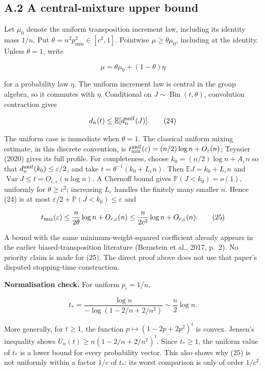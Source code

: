 \documentclass[
  british,
  11pt,
]{article}
\begin{document}
\subsection{A.2 A central-mixture upper
bound}\label{a.2-a-central-mixture-upper-bound}

Let \(\mu_0\) denote the uniform transposition increment law, including
its identity mass \(1/n\). Put \(\theta=n^2p_{\min}^2\in[c^2,1]\).
Pointwise \(\mu\ge\theta\mu_0\), including at the identity. Unless
\(\theta=1\), write

\[\mu=\theta\mu_0+(1-\theta)\eta\]

for a probability law \(\eta\). The uniform increment law is central in
the group algebra, so it commutes with \(\eta\). Conditional on
\(J\sim\operatorname{Bin}(t,\theta)\), convolution contraction gives

\[d_n(t)\le\mathbb E[d_n^{\rm unif}(J)]. \tag{24}\]

The uniform case is immediate when \(\theta=1\). The classical uniform
mixing estimate, in this discrete convention, is
\(t_{\rm mix}^{\rm unif}(\varepsilon)=(n/2)\log n+O_\varepsilon(n)\);
Teyssier (2020) gives its full profile. For completeness, choose
\(k_0=(n/2)\log n+A_\varepsilon n\) so that
\(d_n^{\rm unif}(k_0)\le\varepsilon/2\), and take
\(t=\theta^{-1}(k_0+L_\varepsilon n)\). Then
\(\mathbb E J=k_0+L_\varepsilon n\) and
\(\operatorname{Var}J\le t=O_{c,\varepsilon}(n\log n)\). A Chernoff
bound gives \(\mathbb P(J<k_0)=o(1)\), uniformly for \(\theta\ge c^2\);
increasing \(L_\varepsilon\) handles the finitely many smaller \(n\).
Hence (24) is at most \(\varepsilon/2+\mathbb P(J<k_0)\le\varepsilon\)
and

\[
t_{\rm mix}(\varepsilon)
\le\frac{n}{2\theta}\log n+O_{c,\varepsilon}(n)
\le\frac{n}{2c^2}\log n+O_{c,\varepsilon}(n). \tag{25}
\]

A bound with the same minimum-weight-squared coefficient already appears
in the earlier biased-transposition literature (Bernstein et al., 2017,
p.~2). No priority claim is made for (25). The direct proof above does
not use that paper's disputed stopping-time construction.

\textbf{Normalisation check.} For uniform \(p_i=1/n\),

\[t_*=\frac{\log n}{-\log(1-2/n+2/n^2)}\sim\frac n2\log n.\]

More generally, for \(t\ge1\), the function \(p\mapsto(1-2p+2p^2)^t\) is
convex. Jensen's inequality shows \(U_n(t)\ge n(1-2/n+2/n^2)^t\). Since
\(t_*\ge1\), the uniform value of \(t_*\) is a lower bound for every
probability vector. This also shows why (25) is not uniformly within a
factor \(1/c\) of \(t_*\): its worst comparison is only of order
\(1/c^2\).
\end{document}

